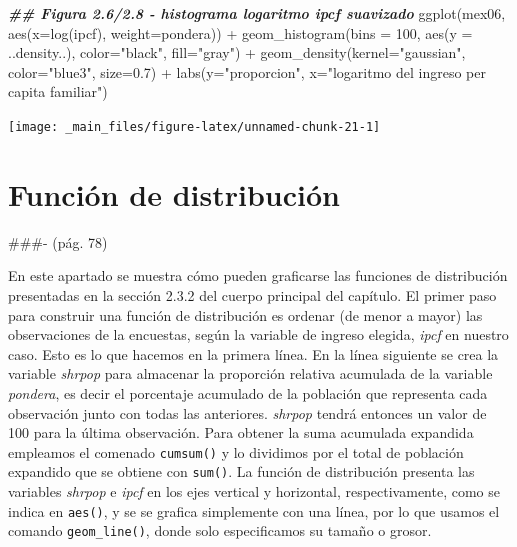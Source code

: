 \documentclass[
]{book}
\newenvironment{Shaded}{\begin{snugshade}}{\end{snugshade}}
\newcommand{\AttributeTok}[1]{\textcolor[rgb]{0.77,0.63,0.00}{#1}}
\newcommand{\DecValTok}[1]{\textcolor[rgb]{0.00,0.00,0.81}{#1}}
\newcommand{\DocumentationTok}[1]{\textcolor[rgb]{0.56,0.35,0.01}{\textbf{\textit{#1}}}}
\newcommand{\FloatTok}[1]{\textcolor[rgb]{0.00,0.00,0.81}{#1}}
\newcommand{\FunctionTok}[1]{\textcolor[rgb]{0.00,0.00,0.00}{#1}}
\newcommand{\NormalTok}[1]{#1}
\newcommand{\SpecialCharTok}[1]{\textcolor[rgb]{0.00,0.00,0.00}{#1}}
\newcommand{\StringTok}[1]{\textcolor[rgb]{0.31,0.60,0.02}{#1}}
\begin{document}
\begin{Shaded}
\begin{Highlighting}[]
\DocumentationTok{\#\# Figura 2.6/2.8 {-} histograma logaritmo ipcf suavizado}
\FunctionTok{ggplot}\NormalTok{(mex06, }
       \FunctionTok{aes}\NormalTok{(}\AttributeTok{x=}\FunctionTok{log}\NormalTok{(ipcf), }\AttributeTok{weight=}\NormalTok{pondera)) }\SpecialCharTok{+} 
  \FunctionTok{geom\_histogram}\NormalTok{(}\AttributeTok{bins =} \DecValTok{100}\NormalTok{, }\FunctionTok{aes}\NormalTok{(}\AttributeTok{y =}\NormalTok{ ..density..), }
                 \AttributeTok{color=}\StringTok{"black"}\NormalTok{, }\AttributeTok{fill=}\StringTok{"gray"}\NormalTok{)  }\SpecialCharTok{+}
  \FunctionTok{geom\_density}\NormalTok{(}\AttributeTok{kernel=}\StringTok{"gaussian"}\NormalTok{, }\AttributeTok{color=}\StringTok{"blue3"}\NormalTok{, }\AttributeTok{size=}\FloatTok{0.7}\NormalTok{) }\SpecialCharTok{+}  
  \FunctionTok{labs}\NormalTok{(}\AttributeTok{y=}\StringTok{"proporcion"}\NormalTok{, }\AttributeTok{x=}\StringTok{"logaritmo del ingreso per capita familiar"}\NormalTok{)}
\end{Highlighting}
\end{Shaded}

\texttt{[image: \_main\_files/figure-latex/unnamed-chunk-21-1]}

\hypertarget{funciuxf3n-de-distribuciuxf3n}{%
\section{Función de distribución}\label{funciuxf3n-de-distribuciuxf3n}}

\#\#\#- (pág. 78)

En este apartado se muestra cómo pueden graficarse las funciones de distribución presentadas en la sección 2.3.2 del cuerpo principal del capítulo. El primer paso para construir una función de distribución es ordenar (de menor a mayor) las observaciones de la encuestas, según la variable de ingreso elegida, \emph{ipcf} en nuestro caso. Esto es lo que hacemos en la primera línea. En la línea siguiente se crea la variable \emph{shrpop} para almacenar la proporción relativa acumulada de la variable \emph{pondera}, es decir el porcentaje acumulado de la población que representa cada observación junto con todas las anteriores. \emph{shrpop} tendrá entonces un valor de 100 para la última observación. Para obtener la suma acumulada expandida empleamos el comenado \texttt{cumsum()} y lo dividimos por el total de población expandido que se obtiene con \texttt{sum()}. La función de distribución presenta las variables \emph{shrpop} e \emph{ipcf} en los ejes vertical y horizontal, respectivamente, como se indica en \texttt{aes()}, y se se grafica simplemente con una línea, por lo que usamos el comando \texttt{geom\_line()}, donde solo especificamos su tamaño o grosor.
\end{document}

